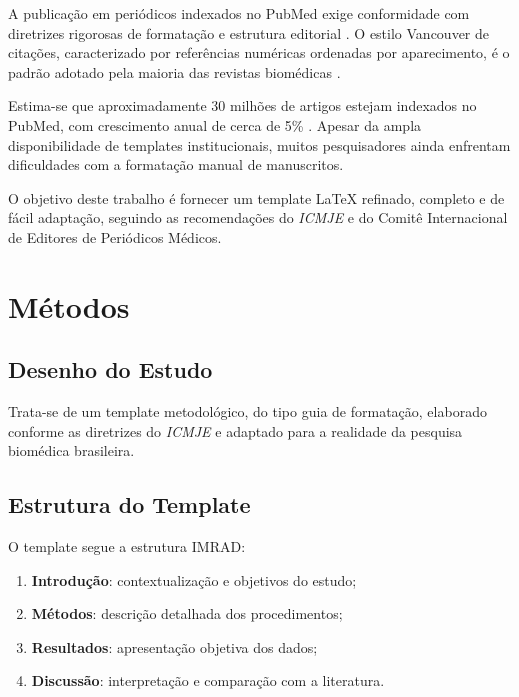 \documentclass[12pt,a4paper]{article}
\newcommand{\ICMJE}{\textit{ICMJE}}
\begin{document}
A publica\c{c}\~ao em peri\'odicos indexados no PubMed exige
conformidade com diretrizes rigorosas de formata\c{c}\~ao e
estrutura editorial \cite{ICMJE2024}. O estilo Vancouver de
cita\c{c}\~oes, caracterizado por refer\^encias num\'ericas
ordenadas por aparecimento, \'e o padr\~ao adotado pela maioria
das revistas biom\'edicas \cite{Patrias2007Citing}.

Estima-se que aproximadamente 30 milh\~oes de artigos estejam
indexados no PubMed, com crescimento anual de cerca de 5\%
\cite{Landhuis2024PubMed}. Apesar da ampla disponibilidade de
templates institucionais, muitos pesquisadores ainda enfrentam
dificuldades com a formata\c{c}\~ao manual de manuscritos.

O objetivo deste trabalho \'e fornecer um template \LaTeX{}
refinado, completo e de f\'acil adapta\c{c}\~ao, seguindo as
recomenda\c{c}\~oes do \ICMJE{} e do Comit\^e Internacional de
Editores de Peri\'odicos M\'edicos.

\section{M\'etodos}
\label{sec:metodos}

\subsection{Desenho do Estudo}

Trata-se de um template metodol\'ogico, do tipo guia de
formata\c{c}\~ao, elaborado conforme as diretrizes do \ICMJE{}
\cite{ICMJE2024} e adaptado para a realidade da pesquisa
biom\'edica brasileira.

\subsection{Estrutura do Template}

O template segue a estrutura IMRAD:

\begin{enumerate}[label=\textbf{\arabic*.}]
    \item \textbf{Introdu\c{c}\~ao}: contextualiza\c{c}\~ao e
        objetivos do estudo;
    \item \textbf{M\'etodos}: descri\c{c}\~ao detalhada dos
        procedimentos;
    \item \textbf{Resultados}: apresenta\c{c}\~ao objetiva dos
        dados;
    \item \textbf{Discuss\~ao}: interpreta\c{c}\~ao e compara\c{c}\~ao
        com a literatura.
\end{enumerate}
\end{document}
